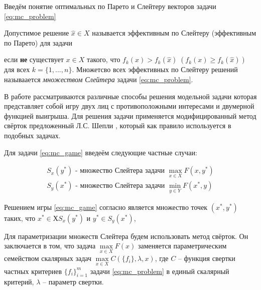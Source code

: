 Введём понятие оптимальных по Парето и Слейтеру векторов задачи 
\eqref{eq:mc_problem}

\begin{Def}
	Допустимое решение $\hat{x}\in{X}$ называется 
	эффективным по Слейтеру (эффективным по Парето) для задачи

	если \textbf{не} существует $x\in{X}$ такого, что 
	$f_k(x)>f_k(\hat{x}) \; (f_k(x) \geqslant f_k(\hat{x}))$ для всех
$k=\{1,...,n\}$. Множетсво всех эффективных по Слейтеру решений называается \textit{множеством Слейтера} задачи \eqref{eq:mc_problem}.
\end{Def}



В работе рассматриваются различные способы решения модельной задачи которая представляет собой игру двух лиц с противоположными интересами и двумерной
функцией выигрыша. Для решения задачи применяется модифицированный
метод свёрток предложенный Л.С. Шепли \cite{shapley}, который как правило используется в
подобных задачах.



Для задачи \eqref{eq:mc_game} введеём следующие частные случаи:

\begin{gather*}
	S_x(y^*) \textrm{ - множество Слейтера задачи } \max\limits_{x \in X} F(x, y^*) \\
	S_y(x^*) \textrm{ - множество Слейтера задачи } \min\limits_{y \in Y} F(x^*, y)
\end{gather*}

\begin{Def}
	Решением игры \eqref{eq:mc_game} согласно \cite{blackwell} 
	является множество точек $(x^*, y^*)$ таких, что
   $x^* \in Х S_x(y^*) $ и $ y^*  \in S_y (x^*)$, 
\end{Def}

\vspace{5mm}

Для параметризации множеств Слейтера будем использовать метод свёрток.
Он заключается в том, что задача $\max\limits_{x \in X} F(x)$ заменяется параметрическим 
семейством скалярных задач $\max\limits_{x \in X} C(\{f_i\}, \lambda, x)$,
где $C$ – функция свертки частных критериев $\{f_i\}_{i=1}^m$ задачи 
\eqref{eq:mc_problem} в единый скалярный критерий, $\lambda$ – параметр свертки. 

